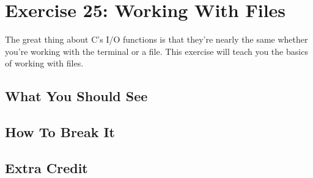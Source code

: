 \chapter{Exercise 25: Working With Files}

The great thing about C's I/O functions is that they're nearly the same
whether you're working with the terminal or a file.  This exercise will
teach you the basics of working with files.

\section{What You Should See}


\section{How To Break It}


\section{Extra Credit}



